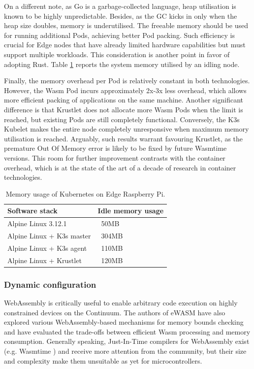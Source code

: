 On a different note, as Go is a garbage-collected language, heap utilisation is known to be highly unpredictable. Besides, as the GC kicks in only when the heap size doubles, memory is underutilised. The freeable memory should be used for running additional Pods, achieving better Pod packing. Such efficiency is crucial for Edge nodes that have already limited hardware capabilities but must support multiple workloads. This consideration is another point in favor of adopting Rust. Table \ref{tab1} reports the system memory utilised by an idling node.

Finally, the memory overhead per Pod is relatively constant in both technologies. However, the Wasm Pod incurs approximately 2x-3x less overhead, which allows more efficient packing of applications on the same machine. Another significant difference is that Krustlet does not allocate more Wasm Pods when the limit is reached, but existing Pods are still completely functional. 
Conversely, the K3s Kubelet makes the entire node completely unresponsive when maximum memory utilisation is reached. Arguably, such results warrant favouring Krustlet, as the premature Out Of Memory error is likely to be fixed by future Wasmtime versions.
This room for further improvement contrasts with the container overhead, which is at the state of the art of a decade of research in container technologies.

\begin{table}\label{tab:k3s-memory-usage}
\caption{Memory usage of Kubernetes on Edge Raspberry Pi.}
\begin{tabular}{|l|l|}
\hline
Software stack & Idle memory usage \\
\hline
Alpine Linux 3.12.1 & ~50MB \\
Alpine Linux + K3s master & ~304MB \\
Alpine Linux + K3s agent & ~110MB \\
Alpine Linux + Krustlet & ~120MB \\
\hline
\end{tabular}
\label{tab1}
\end{table}

\subsubsection{Dynamic configuration}

WebAssembly is critically useful to enable arbitrary code execution on highly constrained devices on the Continuum. The authors of eWASM \cite{peach2020ewasm} have also explored various WebAssembly-based mechanisms for memory bounds checking and have evaluated the trade-offs between efficient Wasm processing and memory consumption. Generally speaking, Just-In-Time compilers for WebAssembly exist (e.g. Wasmtime \cite{wasmtime}) and receive more attention from the community, but their size and complexity make them unsuitable as yet for microcontrollers.


